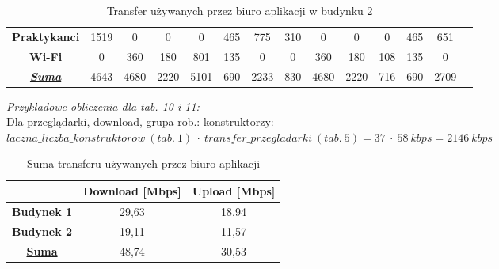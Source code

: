 \documentclass[a4paper, 12pt]{article}
\begin{document}
\begin{itemize}
\begin{table}[H]
{\begin{tabular}{c|c|c|c|c|c|c|c|c|c|c|c|c|l}
\multicolumn{1}{|c|}{\textbf{Praktykanci}}         & 1519                  & 0                         & 0             & 0                   & 465                  & 775                        & 310                   & 0                         & 0             & 0                   & 465                  & 651                      &  \\ \cline{1-13}
\multicolumn{1}{|c|}{\textbf{Wi-Fi}}               & 0                     & 360                       & 180           & 801                 & 135                  & 0                          & 0                     & 360                       & 180           & 108                 & 135                  & 0                        &  \\ \cline{1-13}
\multicolumn{1}{|c|}{{\ul \textit{\textbf{Suma}}}} & 4643                  & 4680                      & 2220          & 5101                & 690                  & 2233                       & 830                   & 4680                      & 2220          & 716                 & 690                  & 2709                     &  \\ \cline{1-13}
\end{tabular}}
\caption{Transfer używanych przez biuro aplikacji w budynku 2}
\end{table}
	
\noindent \textit{Przykładowe obliczenia dla tab. 10 i 11:}\\
Dla przeglądarki, download, grupa rob.: konstruktorzy:\\
\(laczna\_liczba\_konstruktorow\ (tab.\ 1)\ \cdot\ transfer\_przegladarki\ (tab.\ 5) =  37\ \cdot\ 58\ kbps = 2146\ kbps\)\\

\begin{table}[H]
\centering
\begin{tabular}{c|c|c|}
\cline{2-3}
                                          & \textbf{Download {[}Mbps{]}} & \textbf{Upload {[}Mbps{]}} \\ \hline
\multicolumn{1}{|c|}{\textbf{Budynek 1}}  & 29,63                        & 18,94                      \\ \hline
\multicolumn{1}{|c|}{\textbf{Budynek 2}}  & 19,11                        & 11,57                      \\ \hline
\multicolumn{1}{|c|}{{\ul \textbf{Suma}}} & 48,74                        & 30,53                      \\ \hline
\end{tabular}
\caption{Suma transferu używanych przez biuro aplikacji}
\end{table}


\end{itemize}
\end{document}
